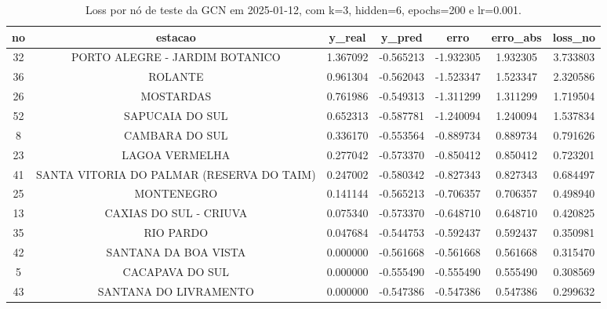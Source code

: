 \begin{table}[h]
\centering
\caption{Loss por nó de teste da GCN em 2025-01-12, com k=3, hidden=6, epochs=200 e lr=0.001.}
\label{tab:gcn_loss_nodes_k3_hidden6}
\begin{tabular}{ccccccc}
\toprule
no & estacao & y\_real & y\_pred & erro & erro\_abs & loss\_no \\
\midrule
32 & PORTO ALEGRE - JARDIM BOTANICO & 1.367092 & -0.565213 & -1.932305 & 1.932305 & 3.733803 \\
36 & ROLANTE & 0.961304 & -0.562043 & -1.523347 & 1.523347 & 2.320586 \\
26 & MOSTARDAS & 0.761986 & -0.549313 & -1.311299 & 1.311299 & 1.719504 \\
52 & SAPUCAIA DO SUL & 0.652313 & -0.587781 & -1.240094 & 1.240094 & 1.537834 \\
8 & CAMBARA DO SUL & 0.336170 & -0.553564 & -0.889734 & 0.889734 & 0.791626 \\
23 & LAGOA VERMELHA & 0.277042 & -0.573370 & -0.850412 & 0.850412 & 0.723201 \\
41 & SANTA VITORIA DO PALMAR (RESERVA DO TAIM) & 0.247002 & -0.580342 & -0.827343 & 0.827343 & 0.684497 \\
25 & MONTENEGRO & 0.141144 & -0.565213 & -0.706357 & 0.706357 & 0.498940 \\
13 & CAXIAS DO SUL - CRIUVA & 0.075340 & -0.573370 & -0.648710 & 0.648710 & 0.420825 \\
35 & RIO PARDO & 0.047684 & -0.544753 & -0.592437 & 0.592437 & 0.350981 \\
42 & SANTANA DA BOA VISTA & 0.000000 & -0.561668 & -0.561668 & 0.561668 & 0.315470 \\
5 & CACAPAVA DO SUL & 0.000000 & -0.555490 & -0.555490 & 0.555490 & 0.308569 \\
43 & SANTANA DO LIVRAMENTO & 0.000000 & -0.547386 & -0.547386 & 0.547386 & 0.299632 \\
\bottomrule
\end{tabular}
\end{table}
